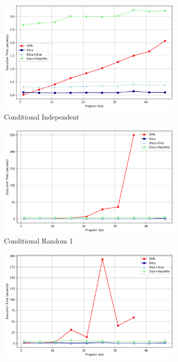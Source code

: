 \begin{figure}[!t]
\centering
\begin{subfigure}{0.32\textwidth}
\includegraphics[width=\textwidth]{../images/scaling/build_conditional_independent_slice.png}
\caption{Conditional Independent}
\label{fig:cond-benchmarks-a}
\end{subfigure}
\hfill
\begin{subfigure}{0.32\textwidth}
\includegraphics[width=\textwidth]{../images/scaling/build_conditional_random_independent_slice_1.png}
\caption{Conditional Random 1}
\label{fig:cond-benchmarks-b}
\end{subfigure}
\hfill
\begin{subfigure}{0.32\textwidth}
\includegraphics[width=\textwidth]{../images/scaling/build_conditional_random_independent_slice_2.png}

\end{subfigure}
\end{figure}
